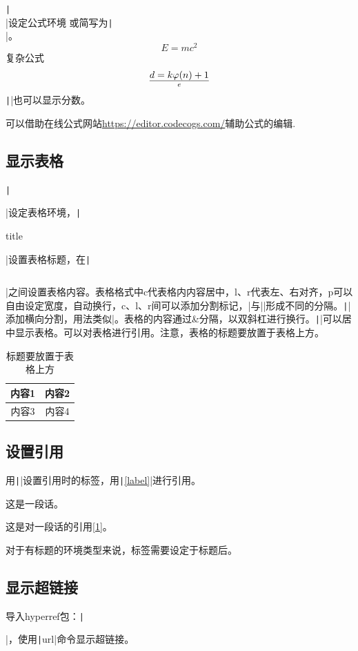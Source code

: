 \documentclass[fontset=ubuntu]{ctexart}
\begin{document}
\texttt|\begin{equation} \end{equation}|设定公式环境
或简写为\texttt|\[ \]|。
\[
E = mc^2
\]
复杂公式
\[
d = {k \varphi(n) + 1} \over e
\]
\texttt|\frac{}{}|也可以显示分数。

可以借助在线公式网站\url{https://editor.codecogs.com/}辅助公式的编辑.

\subsection{显示表格}
\texttt|\begin{table}[h] \end{table}|设定表格环境，\texttt|\caption{title}|设置表格标题，在\texttt|\begin{tabular}{c c c} \end{tabular}|之间设置表格内容。表格格式中c代表格内内容居中，l、r代表左、右对齐，p可以自由设定宽度，自动换行，c、l、r间可以添加分割标记，|与||形成不同的分隔。\texttt|\hline|添加横向分割，用法类似|。表格的内容通过\&分隔，以双斜杠进行换行。\texttt|\centering|可以居中显示表格。可以对表格进行引用。注意，表格的标题要放置于表格上方。
\begin{table}[htb]
    \centering
    \caption{标题要放置于表格上方}
    \begin{tabular}{c||c}
        \hline\hline
        内容1 & 内容2 \\
        \hline
        内容3 & 内容4 
    \end{tabular}
    \label{tab:my_label}
\end{table}

\subsection{设置引用}
用\texttt|\label{label}|设置引用时的标签，用\texttt|\ref{label}|进行引用。

这是一段话\label{1}。

这是对一段话的引用\ref{1}。

对于有标题的环境类型来说，标签需要设定于标题后。

\subsection{显示超链接}
导入hyperref包：\texttt|\usepackage{hyperref}|，使用\texttt|url{}|命令显示超链接。
\end{document}
